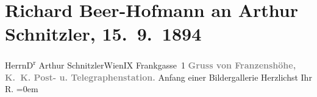 

         
         \renewcommand{\erwaehntePersonen}{Personen: Richard Beer-Hofmann}
         \renewcommand{\erwaehnteOrte}{Orte: Berghotel Franzenshöhe, Frankgasse 1, IX., Alsergrund, Stilfser Joch, Wien}
         \renewcommand{\erwaehnteWerke}{}
               \section[Richard Beer-Hofmann an Arthur Schnitzler, 15. 9. 1894]{ Richard Beer-Hofmann an Arthur Schnitzler, 15. 9. 1894}\nopagebreak{}\rehead{ }\begin{ledgroupsized}[t]{13cm}\normalsize\beginnumbering \toendnotes[C]{\smallbreak\pagebreak[2]} 
\pstart{}{\pb}Herrn\pend{}\pstart{}D\textsuperscript{r} Arthur Schnitzler\pend{}\pstart{}Wien\pend{}\pstart{}IX Frankgasse 1\pend{}{\bigskip}\pstart
           \noindent{}\centering{}{\pb}\textcolor{gray}{\textbf{Gruss von Franzenshöhe, K. K. Post- u.
                        Telegraphenstation.}}\pend
           \pstart
           Anfang einer Bildergallerie\pend
           \pstart
           Herzlichst Ihr{\\[\baselineskip]}\spacefill\mbox{R.}\pend
           \leftskip=0em{}
         
         \endnumbering{}\end{ledgroupsized}  \newcommand{\dateiname}{L00369}\newcommand{\titel}{Richard Beer-Hofmann an Arthur Schnitzler, 15. 9. 1894}\newcommand{\editorInnen}{Martin Anton Müller und Gerd-Hermann Susen}
      